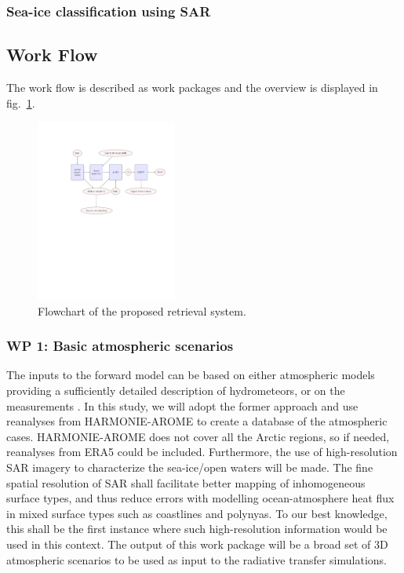 \documentclass[12pt,oneside,a4paper]{article}
\begin{document}
\subsubsection{Sea-ice classification using SAR}



\subsection{Work Flow}
\label{sec:wp}
The work flow is described as work packages and the overview is displayed in fig.~\ref{fig:flowchart}. 

\begin{figure}[t]
	\centering
	\includegraphics[trim=140 370 40 125,clip,height = 60mm]{flowchart.pdf} 
	\caption{Flowchart of the proposed retrieval system.}
	\label{fig:flowchart}
\end{figure}

\vspace{-1ex}
\subsubsection*{WP 1: Basic atmospheric scenarios}
%

\label{sec:atmscenes}
The inputs to the forward model can be based on either atmospheric models providing a sufficiently detailed description of hydrometeors, or on the measurements \citep{ekelund:using:20}. In this study, we will adopt the former approach and use reanalyses from HARMONIE-AROME to create a database of the atmospheric cases. HARMONIE-AROME does not cover all the Arctic regions, so if needed, reanalyses from ERA5 could be included. Furthermore, the use of high-resolution SAR imagery to characterize the sea-ice/open waters will be made. The fine spatial resolution of SAR shall facilitate better mapping of inhomogeneous surface types, and thus reduce errors with modelling ocean-atmosphere heat flux in mixed surface types such as coastlines and polynyas. To our best knowledge, this shall be the first instance where such high-resolution information would be used in this context. 
The output of this work package will be a broad set of 3D atmospheric scenarios to be used as input to the radiative transfer simulations.
\vspace{-1.0ex}
\end{document}
